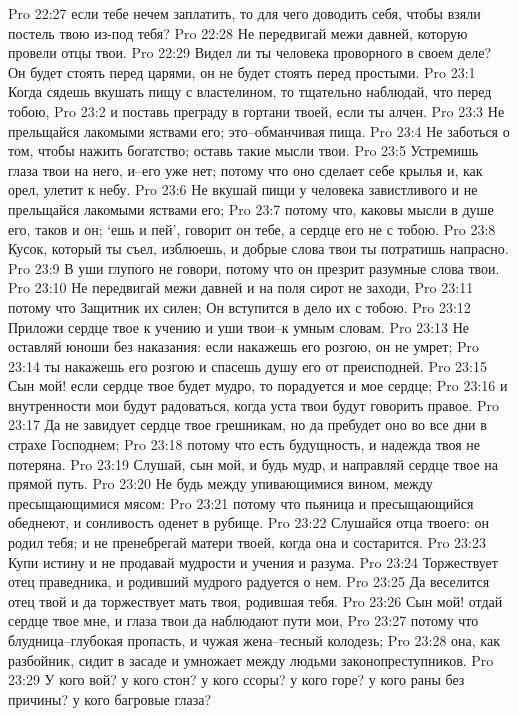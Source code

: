 Pro 22:27  если тебе нечем заплатить, то для чего доводить себя, чтобы взяли постель твою из-под тебя?
Pro 22:28  Не передвигай межи давней, которую провели отцы твои.
Pro 22:29  Видел ли ты человека проворного в своем деле? Он будет стоять перед царями, он не будет стоять перед простыми.
Pro 23:1  Когда сядешь вкушать пищу с властелином, то тщательно наблюдай, что перед тобою,
Pro 23:2  и поставь преграду в гортани твоей, если ты алчен.
Pro 23:3  Не прельщайся лакомыми яствами его; это--обманчивая пища.
Pro 23:4  Не заботься о том, чтобы нажить богатство; оставь такие мысли твои.
Pro 23:5  Устремишь глаза твои на него, и--его уже нет; потому что оно сделает себе крылья и, как орел, улетит к небу.
Pro 23:6  Не вкушай пищи у человека завистливого и не прельщайся лакомыми яствами его;
Pro 23:7  потому что, каковы мысли в душе его, таков и он; `ешь и пей', говорит он тебе, а сердце его не с тобою.
Pro 23:8  Кусок, который ты съел, изблюешь, и добрые слова твои ты потратишь напрасно.
Pro 23:9  В уши глупого не говори, потому что он презрит разумные слова твои.
Pro 23:10  Не передвигай межи давней и на поля сирот не заходи,
Pro 23:11  потому что Защитник их силен; Он вступится в дело их с тобою.
Pro 23:12  Приложи сердце твое к учению и уши твои--к умным словам.
Pro 23:13  Не оставляй юноши без наказания: если накажешь его розгою, он не умрет;
Pro 23:14  ты накажешь его розгою и спасешь душу его от преисподней.
Pro 23:15  Сын мой! если сердце твое будет мудро, то порадуется и мое сердце;
Pro 23:16  и внутренности мои будут радоваться, когда уста твои будут говорить правое.
Pro 23:17  Да не завидует сердце твое грешникам, но да пребудет оно во все дни в страхе Господнем;
Pro 23:18  потому что есть будущность, и надежда твоя не потеряна.
Pro 23:19  Слушай, сын мой, и будь мудр, и направляй сердце твое на прямой путь.
Pro 23:20  Не будь между упивающимися вином, между пресыщающимися мясом:
Pro 23:21  потому что пьяница и пресыщающийся обеднеют, и сонливость оденет в рубище.
Pro 23:22  Слушайся отца твоего: он родил тебя; и не пренебрегай матери твоей, когда она и состарится.
Pro 23:23  Купи истину и не продавай мудрости и учения и разума.
Pro 23:24  Торжествует отец праведника, и родивший мудрого радуется о нем.
Pro 23:25  Да веселится отец твой и да торжествует мать твоя, родившая тебя.
Pro 23:26  Сын мой! отдай сердце твое мне, и глаза твои да наблюдают пути мои,
Pro 23:27  потому что блудница--глубокая пропасть, и чужая жена--тесный колодезь;
Pro 23:28  она, как разбойник, сидит в засаде и умножает между людьми законопреступников.
Pro 23:29  У кого вой? у кого стон? у кого ссоры? у кого горе? у кого раны без причины? у кого багровые глаза?

